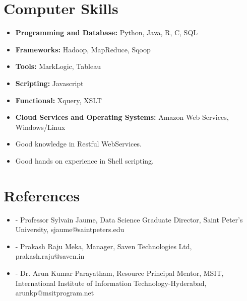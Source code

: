 \documentclass[11pt,a4paper,sans]{moderncv}        %
\begin{document}
\section{Computer Skills}
\vspace{6pt}
\begin{itemize}
\item \textbf{Programming and Database:} Python, Java, R, C, SQL
\vspace{6pt}
\item \textbf{Frameworks:} Hadoop, MapReduce, Sqoop
\vspace{6pt}
\item \textbf{Tools:} MarkLogic, Tableau
\vspace{6pt}
\item \textbf{Scripting:} Javascript
\vspace{6pt}
\item \textbf{Functional:} Xquery, XSLT
\vspace{6pt}
\item \textbf{Cloud Services and Operating Systems:} Amazon Web Services, Windows/Linux
\vspace{6pt}
\item {Good knowledge in Restful WebServices.} 
\vspace{6pt}
\item {Good hands on experience in Shell scripting.} 
\end{itemize}

\section{References}
\vspace{6pt}
\begin{itemize}
\item{- Professor Sylvain Jaume, Data Science Graduate Director, Saint Peter’s University, sjaume@saintpeters.edu}
\item{- Prakash Raju Meka, Manager, Saven Technologies Ltd, prakash.raju@saven.in}
\item{- Dr. Arun Kumar Parayatham, Resource Principal Mentor, MSIT, International Institute of Information Technology-Hyderabad, arunkp@msitprogram.net}

\end{itemize}

\nocite{*}

\end{document}
